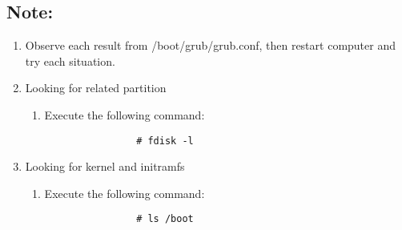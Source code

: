 \documentclass[a4paper,10pt]{article}
\begin{document}
\subsection*{Note:}
    \begin{enumerate}
    \item Observe each result from /boot/grub/grub.conf, then restart computer and try each situation.
    \item Looking for related partition
        \begin{enumerate}
            \item Execute the following command:
            \begin{verbatim}
                # fdisk -l
            \end{verbatim}
        \end{enumerate}
    \item Looking for kernel and initramfs
        \begin{enumerate}
            \item Execute the following command:
            \begin{verbatim}
                # ls /boot
            \end{verbatim}
        \end{enumerate}
    \end{enumerate}
\end{document}
